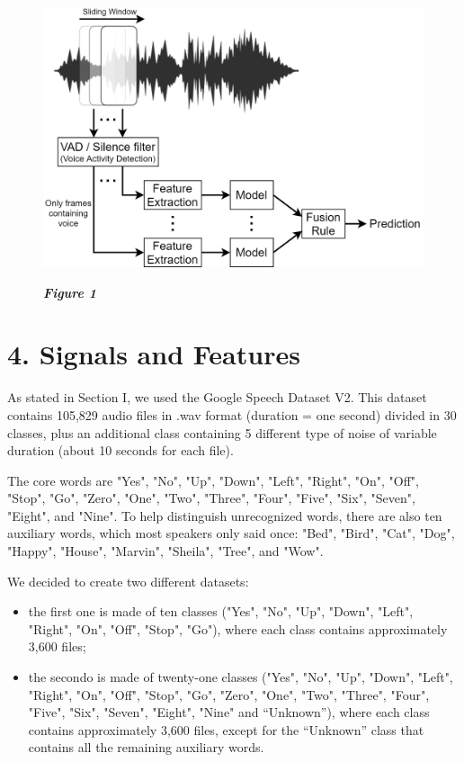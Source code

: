 \documentclass[conference]{IEEEtran}
\begin{document}
\begin{figure}
\centering
\includegraphics[scale=0.16]{End-To-End}
\begin{small}\textit{\textbf{Figure 1}}
\end{small}
\end{figure}

\section{4.	Signals and Features}
As stated in Section I, we used the Google Speech Dataset V2. This dataset contains 105,829 audio files in .wav format (duration =  one second) divided in 30 classes, plus an additional class containing 5 different type of noise of variable duration (about 10 seconds for each file).

The core words are "Yes", "No", "Up", "Down", "Left", "Right", "On", "Off", "Stop", "Go", "Zero", "One", "Two", "Three", "Four", "Five", "Six", "Seven", "Eight", and "Nine". To help distinguish unrecognized words, there are also ten auxiliary words, which most speakers only said once: "Bed", "Bird", "Cat", "Dog", "Happy", "House", "Marvin", "Sheila", "Tree", and "Wow".

We decided to create two different datasets:
\begin{itemize}
\item the first one is made of ten classes ("Yes", "No", "Up", "Down", "Left", "Right", "On", "Off", "Stop", "Go"), where each class contains approximately 3,600 files;
\item the secondo is made of twenty-one classes ("Yes", "No", "Up", "Down", "Left", "Right", "On", "Off", "Stop", "Go", "Zero", "One", "Two", "Three", "Four", "Five", "Six", "Seven", "Eight", "Nine" and “Unknown”), where each class contains approximately 3,600 files, except for the “Unknown” class that contains all the remaining auxiliary words.
\end{itemize}
\end{document}
